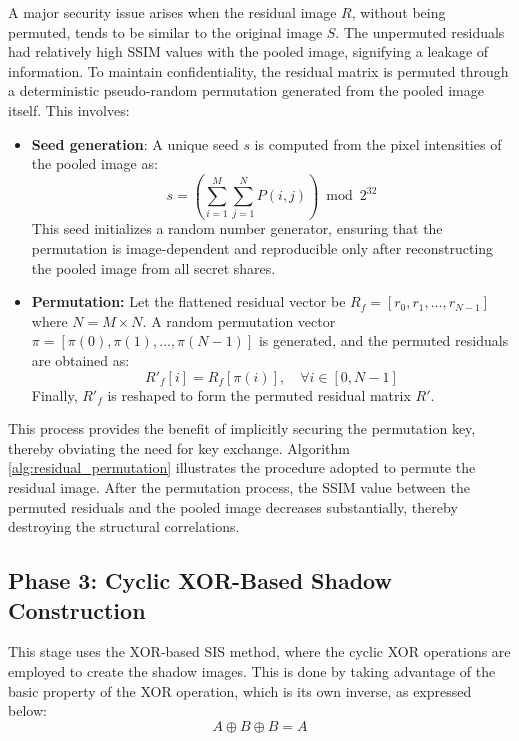 A major security issue arises when the residual image $R$, without being permuted, tends to be similar to the original image $S$. The unpermuted residuals had relatively high SSIM values with the pooled image, signifying a leakage of information. To maintain confidentiality, the residual matrix is permuted through a deterministic pseudo-random permutation generated from the pooled image itself. This involves:

\begin{itemize}
    \item \textbf{Seed generation}: A unique seed $s$ is computed from the pixel intensities of the pooled image as:
\begin{equation}
s = \left( \sum_{i=1}^{M} \sum_{j=1}^{N} P(i,j) \right) \bmod 2^{32}
\end{equation}
This seed initializes a random number generator, ensuring that the permutation is image-dependent and reproducible only after reconstructing the pooled image from all secret shares.

\item \textbf{Permutation:}
Let the flattened residual vector be $R_f = [r_0, r_1, \dots, r_{N-1}]$ where $N = M \times N$.  
A random permutation vector $\pi = [\pi(0), \pi(1), \dots, \pi(N-1)]$ is generated, and the permuted residuals are obtained as:
\begin{equation}
R'_f[i] = R_f[\pi(i)], \quad \forall i \in [0, N-1]
\end{equation}
Finally, $R'_f$ is reshaped to form the permuted residual matrix $R'$.

\end{itemize}

This process provides the benefit of implicitly securing the permutation key, thereby obviating the need for key exchange. Algorithm \ref{alg:residual_permutation} illustrates the procedure adopted to permute the residual image. After the permutation process, the SSIM value between the permuted residuals and the pooled image decreases substantially, thereby destroying the structural correlations.

\subsection{Phase 3: Cyclic XOR-Based Shadow Construction}

This stage uses the XOR-based SIS method, where the cyclic XOR operations are employed to create the shadow images. This is done by taking advantage of the basic property of the XOR operation, which is its own inverse, as expressed below:
\begin{equation}
A \oplus B \oplus B = A
\end{equation}

